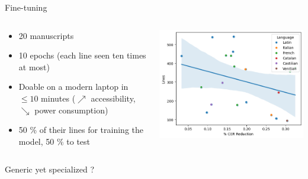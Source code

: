 \documentclass[aspectratio=169]{beamer}
\begin{document}
\begin{frame}{Fine-tuning}
    \begin{columns}
        \begin{column}{.5\linewidth}
            \begin{itemize}
                \item 20 manuscripts
                \item 10 epochs (each line seen ten times at most)
                \item Doable on a modern laptop in $\leq 10$ minutes ($\nearrow$ accessibility, $\searrow$ power consumption)
                \item 50 \% of their lines for training the model, 50 \% to test
                
            \end{itemize}
        \end{column}
        \begin{column}{.5\linewidth}
            \centering
            \includegraphics[width=\linewidth]{cv-for-ch/images/finetuning.png}
        \end{column}
    \end{columns}
\end{frame}

\begin{frame}{Generic yet specialized ?}
\end{frame}
\end{document}
